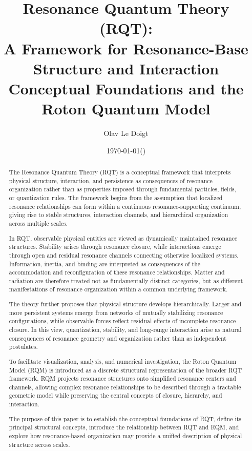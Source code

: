 \documentclass[11pt,a4paper]{article}
\title{Resonance Quantum Theory (RQT):\\
A Framework for Resonance-Base Structure and Interaction\\
Conceptual Foundations and the Roton Quantum Model}
\author{Olav Le Doigt}
\date{\today\;\;(\paperversion)}
\begin{document}
\maketitle


\begin{abstract}
The Resonance Quantum Theory (RQT) is a conceptual framework that interprets physical structure, interaction, and persistence as consequences of resonance organization rather than as properties imposed through fundamental particles, fields, or quantization rules. The framework begins from the assumption that localized resonance relationships can form within a continuous resonance-supporting continuum, giving rise to stable structures, interaction channels, and hierarchical organization across multiple scales.

In RQT, observable physical entities are viewed as dynamically maintained resonance structures. Stability arises through resonance closure, while interactions emerge through open and residual resonance channels connecting otherwise localized systems. Information, inertia, and binding are interpreted as consequences of the accommodation and reconfiguration of these resonance relationships. Matter and radiation are therefore treated not as fundamentally distinct categories, but as different manifestations of resonance organization within a common underlying framework.

The theory further proposes that physical structure develops hierarchically. Larger and more persistent systems emerge from networks of mutually stabilizing resonance configurations, while observable forces reflect residual effects of incomplete resonance closure. In this view, quantization, stability, and long-range interaction arise as natural consequences of resonance geometry and organization rather than as independent postulates.

To facilitate visualization, analysis, and numerical investigation, the Roton Quantum Model (RQM) is introduced as a discrete structural representation of the broader RQT framework. RQM projects resonance structures onto simplified resonance centers and channels, allowing complex resonance relationships to be described through a tractable geometric model while preserving the central concepts of closure, hierarchy, and interaction.

The purpose of this paper is to establish the conceptual foundations of RQT, define its principal structural concepts, introduce the relationship between RQT and RQM, and explore how resonance-based organization may provide a unified description of physical structure across scales.

\end{abstract}
\end{document}
